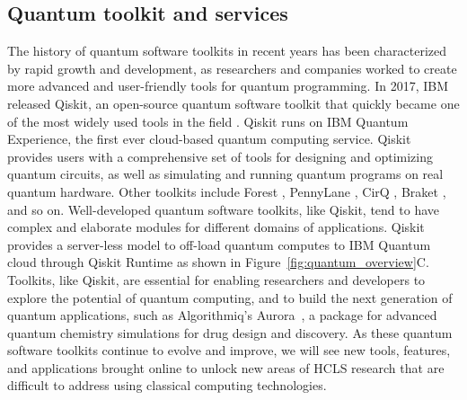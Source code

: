 \documentclass{article}
\begin{document}
\subsection{Quantum toolkit and services}
The history of quantum software toolkits in recent years has been characterized by rapid growth and development, as researchers and companies  worked to create more advanced and user-friendly tools for quantum programming. In 2017, IBM released Qiskit, an open-source quantum software toolkit that quickly became one of the most widely used tools in the field \cite{cross2018ibm}. Qiskit runs on IBM Quantum Experience, the first ever cloud-based quantum computing service. Qiskit provides users with a comprehensive set of tools for designing and optimizing quantum circuits, as well as simulating and running quantum programs on real quantum hardware. Other toolkits include Forest \cite{computing2019pyquil}, PennyLane \cite{bergholm2018pennylane}, CirQ \cite{hancockcirq}, Braket \cite{gonzalez2021cloud}, and so on. 
Well-developed quantum software toolkits, like Qiskit, tend to have complex and elaborate modules for different domains of applications. 
Qiskit provides a server-less model to off-load quantum computes to IBM Quantum cloud through Qiskit Runtime as shown in Figure~\ref{fig:quantum_overview}C.
Toolkits, like Qiskit, are essential for enabling researchers and developers to explore the potential of quantum computing, and to build the next generation of quantum applications, such as Algorithmiq’s Aurora~\cite{algorithmiqAurora}, a package for advanced quantum chemistry simulations for drug design and discovery. As these quantum software toolkits continue to evolve and improve, we will see new tools, features, and applications brought online to unlock new areas of HCLS research that are difficult to address using classical computing technologies.
\end{document}
